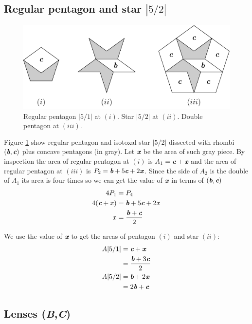 \documentclass[11pt]{article}
\def\mathbi#1{\textbf{\em #1}}
\begin{document}
\subsection{Regular pentagon and star $|5/2|$}

\begin{figure}[H]
\centering
\includegraphics[scale=1.1]{bc/penta}
\caption{Regular pentagon $|5/1|$ at $(i)$. Star $|5/2|$ at $(ii)$. Double pentagon at $(iii)$.}
\label{fig:bc-penta}
\end{figure}

Figure \ref{fig:bc-penta} show regular pentagon and isotoxal star $|5/2|$ dissected with rhombi $(\mathbi{b},\mathbi{c})$ plus concave pentagons (in gray). Let $\mathbi{x}$ be the area of such gray piece. By inspection the area of regular pentagon at $(i)$ is $A_1 = \mathbi{c} + \mathbi{x}$ and the area of regular pentagon at $(iii)$ is $P_2 = \mathbi{b} + 5\mathbi{c} + 2\mathbi{x}$. Since the side of $A_2$ is the double of $A_1$ its area is four times so we can get the value of $\mathbi{x}$ in terms of $(\mathbi{b},\mathbi{c})$
\begin{align}
4P_1 &= P_4 \nonumber\\
4(\mathbi{c} + x) &= \mathbi{b} + 5\mathbi{c} + 2x\nonumber\\
x &= \frac{\mathbi{b} + \mathbi{c}}2
\end{align}

We use the value of $\mathbi{x}$ to get the areas of pentagon $(i)$ and star $(ii)$:
\begin{align}
A|5/1| &= \mathbi{c} + \mathbi{x} \nonumber\\
 &= \frac{\mathbi{b} + 3\mathbi{c}}2 \\
A|5/2| &= \mathbi{b} + 2\mathbi{x} \nonumber\\
 &= 2\mathbi{b} + \mathbi{c}
\end{align}

\subsection{Lenses (\mathbi{B},\mathbi{C})}
\end{document}
